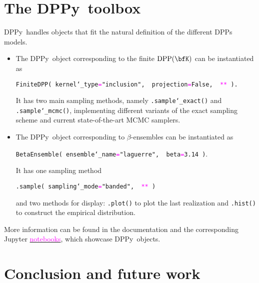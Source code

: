 \documentclass[twoside,11pt]{article}
\makeatletter
\newcommand{\DPPy}{\textsf{DPPy}}
\newcommand\DPP{\operatorname{DPP}}
\newcommand{\pygreen}[1]{\textcolor{deepgreen}{#1}}
\newcommand{\pystr}[1]{\textcolor{deepred}{"#1"}}
\newcommand{\pylrcb}[1]{\string{#1\string}}
\newcommand{\pykwargs}{\textcolor{magenta}{**}}
\newcommand{\pyeq}{\textcolor{magenta}{=}}
\newcommand{\pyus}{\texttt{\char`_}}
\newcommand\footnoteref[1]{\protected@xdef\@thefnmark{\ref{#1}}\@footnotemark}
\newenvironment{nscenter}
 {\parskip=3pt\par\nopagebreak\centering}
 {\parskip=2pt\par\noindent\ignorespacesafterend}
\makeatother
\begin{document}


\section{The \DPPy\ toolbox} %
\label{sec:the_dppy_toolbox}

  \DPPy\ handles objects that fit the natural definition of the different DPPs models.
  \begin{itemize}
	  \item The \DPPy\ object corresponding to the finite $\DPP(\bfK)$ can be instantiated as
    \begin{nscenter}
      \texttt{FiniteDPP(%
        kernel\pyus type\pyeq\pystr{inclusion},\,%
        projection\pyeq\pygreen{False},\,%
        \pykwargs\pylrcb{%
          \pystr{K}:K}%
        ).}
    \end{nscenter}
		It has two main sampling methods, namely \texttt{.sample\pyus exact()} and \texttt{.sample\pyus mcmc()}, implementing different variants of the exact sampling scheme and current state-of-the-art MCMC samplers.

		\item The \DPPy\ object corresponding to $\beta$-ensembles can be instantiated as
    \begin{nscenter}
      \texttt{BetaEnsemble(%
        ensemble\pyus name\pyeq\pystr{laguerre},\,%
        beta\pyeq\pygreen{3.14}%
        )}.
    \end{nscenter}
		It has one sampling method
    \begin{nscenter}
      \texttt{.sample(%
        sampling\pyus mode\pyeq\pystr{banded},\,%
        \pykwargs\pylrcb{%
          \pystr{shape}:\pygreen{10},\,%
          \pystr{scale}:\pygreen{2.0},\,%
          \pystr{size}:\pygreen{50}}%
        )}
    \end{nscenter}
		and two methods for display: \texttt{.plot()} to plot the last realization and \texttt{.hist()} to construct the empirical distribution.
  \end{itemize}
  More information can be found in the documentation\footnoteref{fn:docs} and the corresponding Jupyter \href{https://github.com/guilgautier/DPPy/tree/master/notebooks}{\textcolor{magenta}{notebooks}}, which showcase \DPPy\ objects.


\section{Conclusion and future work} %
\label{sec:conclusion_and_future_work}
\end{document}
